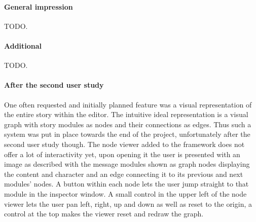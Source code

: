 \paragraph{General impression} TODO.
\paragraph{Additional} TODO.

\paragraph{After the second user study} One often requested and initially planned feature was a visual representation of the entire story within the editor. The intuitive ideal representation is a visual graph with story modules as nodes and their connections as edges. Thus such a system was put in place towards the end of the project, unfortunately after the second user study though. The node viewer added to the framework does not offer a lot of interactivity yet, upon opening it the user is presented with an image as described with the message modules shown as graph nodes displaying the content and character and an edge connecting it to its previous and next modules' nodes. A button within each node lets the user jump straight to that module in the inspector window. A small control in the upper left of the node viewer lets the user pan left, right, up and down as well as reset to the origin, a control at the top makes the viewer reset and redraw the graph.